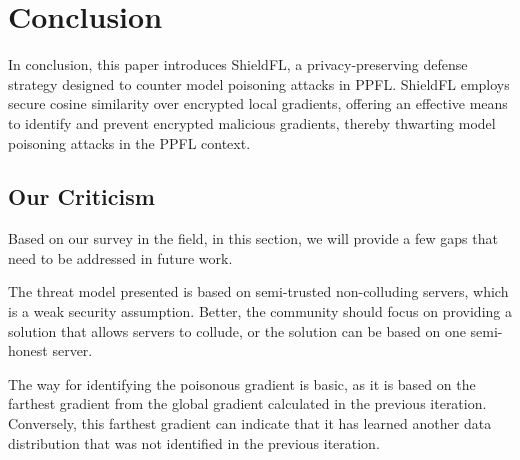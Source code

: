 \section{Conclusion}
\label{sec:conclusion}

In conclusion, this paper introduces ShieldFL, a privacy-preserving defense strategy designed to counter model poisoning attacks in PPFL.
ShieldFL employs secure cosine similarity over encrypted local gradients, offering an effective means to identify and prevent encrypted malicious gradients, thereby thwarting model poisoning attacks in the PPFL context. 

\subsection{Our Criticism}

Based on our survey in the field, in this section, we will provide a few gaps that need to be addressed in future work.
\begin{enumerate*}
    \item The threat model presented is based on semi-trusted non-colluding servers, which is a weak security assumption.
    Better, the community should focus on providing a solution that allows servers to collude, or the solution can be based on one semi-honest server.
    \item The way for identifying the poisonous gradient is basic, as it is based on the farthest gradient from the global gradient calculated in the previous iteration.
    Conversely, this farthest gradient can indicate that it has learned another data distribution that was not identified in the previous iteration.
\end{enumerate*}
